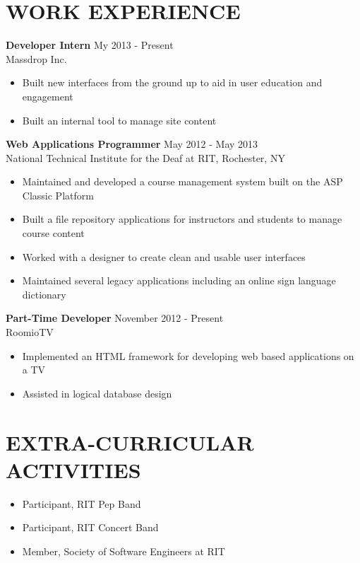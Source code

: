 \documentclass[line,margin]{res}
\begin{document}
\begin{resume}
\section{WORK EXPERIENCE} 
			   {\bf Developer Intern} \hfill My 2013 - Present  \\
			   Massdrop Inc.
			   \begin{itemize} \itemsep -2pt
				  \item Built new interfaces from the ground up to aid in user education and engagement
				  \item Built an internal tool to manage site content
			   \end{itemize}

			   {\bf Web Applications Programmer} \hfill May 2012 - May 2013\\
               National Technical Institute for the Deaf at RIT, 
               Rochester, NY
               
                 \begin{itemize}  \itemsep -2pt %
				  \item Maintained and developed a course management system built on the ASP Classic Platform
                  \item Built a file repository applications for instructors and students to manage course content
                  \item Worked with a designer to create clean and usable user interfaces
                  \item Maintained several legacy applications including an online sign language dictionary
                \end{itemize}
 

   
                {\bf Part-Time Developer} \hfill            November 2012 - Present\\
                  RoomioTV
                  \begin{itemize}  \itemsep -2pt %
                     \item Implemented an HTML framework for developing web based applications on a TV
                     \item Assisted in logical database design
                 \end{itemize} 
 
				 \section{EXTRA-CURRICULAR \\ ACTIVITIES}             
				     \begin{itemize}  \itemsep -2pt 
						\item Participant, RIT Pep Band
				     	\item Participant, RIT Concert Band 
					 	\item Member, Society of Software Engineers at RIT
				 	\end{itemize} 
\end{resume}
\end{document}
